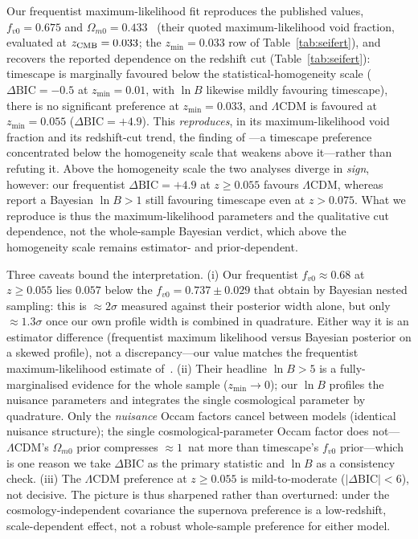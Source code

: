 \documentclass[aps,prd,twocolumn,nofootinbib,superscriptaddress,floatfix]{revtex4-2}
\newcommand{\fvo}{f_{v0}}
\newcommand{\Lcdm}{\Lambda\mathrm{CDM}}
\newcommand{\dBIC}{\Delta\mathrm{BIC}}
\begin{document}
Our frequentist maximum-likelihood fit reproduces the published values,
$\fvo=0.675$ and $\Omega_{m0}=0.433$~\cite{Lane2025} (their quoted maximum-likelihood
void fraction, evaluated at $z_{\rm CMB}=0.033$; the $z_{\min}=0.033$ row of
Table~\ref{tab:seifert}), and recovers the reported
dependence on the redshift cut (Table~\ref{tab:seifert}): timescape is marginally
favoured below the statistical-homogeneity scale ($\dBIC=-0.5$ at $z_{\min}=0.01$,
with $\ln B$ likewise mildly favouring timescape), there is no significant
preference at $z_{\min}=0.033$, and $\Lcdm$ is favoured at $z_{\min}=0.055$
($\dBIC=+4.9$). This \emph{reproduces}, in its maximum-likelihood void fraction and its redshift-cut
trend, the finding of
\cite{Lane2025,Seifert2024}---a timescape preference concentrated below the
homogeneity scale that weakens above it---rather than refuting it. Above the homogeneity
scale the two analyses diverge in \emph{sign}, however: our frequentist $\dBIC=+4.9$ at
$z\geq0.055$ favours $\Lcdm$, whereas~\cite{Seifert2024} report a Bayesian $\ln B>1$
still favouring timescape even at $z>0.075$. What we reproduce is thus the
maximum-likelihood parameters and the qualitative cut dependence, not the whole-sample
Bayesian verdict, which above the homogeneity scale remains estimator- and
prior-dependent.

Three caveats bound the interpretation. (i) Our frequentist $\fvo\approx0.68$ at
$z\geq0.055$ lies $0.057$ below the $\fvo=0.737\pm0.029$ that
\cite{Seifert2024} obtain by Bayesian nested sampling: this is $\approx2\sigma$ measured
against their posterior width alone, but only $\approx1.3\sigma$ once our own profile
width is combined in quadrature. Either way it is an
estimator difference (frequentist maximum likelihood versus Bayesian posterior on
a skewed profile), not a discrepancy---our value matches the frequentist
maximum-likelihood estimate of~\cite{Lane2025}. (ii) Their headline $\ln B>5$ is
a fully-marginalised evidence for the whole sample ($z_{\min}\!\to\!0$); our
$\ln B$ profiles the nuisance parameters and integrates the single cosmological
parameter by quadrature. Only the \emph{nuisance} Occam factors cancel between models
(identical nuisance structure); the single cosmological-parameter Occam factor does
not---$\Lcdm$'s $\Omega_{m0}$ prior compresses $\approx1$~nat more than timescape's
$\fvo$ prior---which is one reason we take $\dBIC$ as the primary statistic and
$\ln B$ as a consistency check. (iii) The $\Lcdm$ preference at $z\geq0.055$ is
mild-to-moderate ($|\dBIC|<6$), not decisive. The picture is thus sharpened rather
than overturned: under the cosmology-independent covariance the supernova
preference is a low-redshift, scale-dependent effect, not a robust whole-sample
preference for either model.
\end{document}
